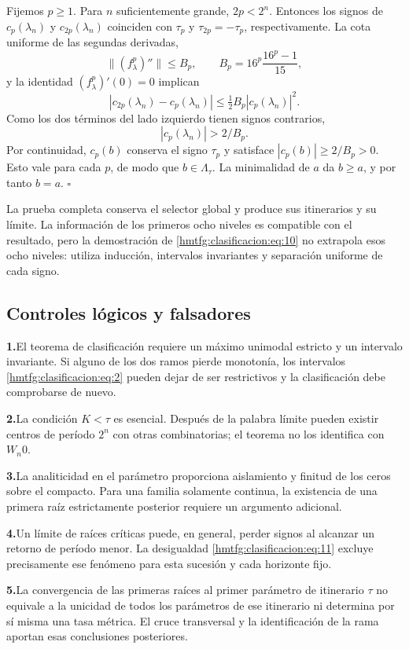 Fijemos \(p\ge1\). Para \(n\) suficientemente grande, \(2p<2^n\). Entonces los signos de \(c_p(\lambda_n)\) y \(c_{2p}(\lambda_n)\) coinciden con \(\tau_p\) y \(\tau_{2p}=-\tau_p\), respectivamente. La cota uniforme de las segundas derivadas,
\[
\|(f_\lambda^p)''\|\le B_p,
\qquad B_p=16^p\frac{16^p-1}{15},
\]
y la identidad \((f_\lambda^p)'(0)=0\) implican
\[
|c_{2p}(\lambda_n)-c_p(\lambda_n)|
\le\tfrac12B_p|c_p(\lambda_n)|^2.
\]
Como los dos términos del lado izquierdo tienen signos contrarios,
\begin{equation}
|c_p(\lambda_n)|>2/B_p.
\label{hmtfg:clasificacion:eq:11}
\end{equation}
Por continuidad, \(c_p(b)\) conserva el signo \(\tau_p\) y satisface \(|c_p(b)|\ge2/B_p>0\). Esto vale para cada \(p\), de modo que \(b\in\Lambda_\tau\). La minimalidad de \(a\) da \(b\ge a\), y por tanto \(b=a\). \(\square\)

La prueba completa conserva el selector global y produce sus itinerarios y su límite. La información de los primeros ocho niveles es compatible con el resultado, pero la demostración de \eqref{hmtfg:clasificacion:eq:10} no extrapola esos ocho niveles: utiliza inducción, intervalos invariantes y separación uniforme de cada signo.


\subsection{Controles lógicos y falsadores}
\label{hmtfg:clasificacion:7}

\par\noindent\textbf{1.}\enspace El teorema de clasificación requiere un máximo unimodal estricto y un intervalo invariante. Si alguno de los dos ramos pierde monotonía, los intervalos \eqref{hmtfg:clasificacion:eq:2} pueden dejar de ser restrictivos y la clasificación debe comprobarse de nuevo.
\par\noindent\textbf{2.}\enspace La condición \(K<\tau\) es esencial. Después de la palabra límite pueden existir centros de período \(2^n\) con otras combinatorias; el teorema no los identifica con \(W_n0\).
\par\noindent\textbf{3.}\enspace La analiticidad en el parámetro proporciona aislamiento y finitud de los ceros sobre el compacto. Para una familia solamente continua, la existencia de una primera raíz estrictamente posterior requiere un argumento adicional.
\par\noindent\textbf{4.}\enspace Un límite de raíces críticas puede, en general, perder signos al alcanzar un retorno de período menor. La desigualdad \eqref{hmtfg:clasificacion:eq:11} excluye precisamente ese fenómeno para esta sucesión y cada horizonte fijo.
\par\noindent\textbf{5.}\enspace La convergencia de las primeras raíces al primer parámetro de itinerario \(\tau\) no equivale a la unicidad de todos los parámetros de ese itinerario ni determina por sí misma una tasa métrica. El cruce transversal y la identificación de la rama aportan esas conclusiones posteriores.
